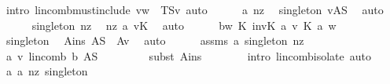\begin{isabellebody}
\ {\isacharparenleft}intro\ lincomb{\isacharunderscore}must{\isacharunderscore}include{\isacharbrackleft}\ {\isacharquery}v{\isacharequal}{\isachardoublequoteopen}w{\isachardoublequoteclose}\ \ {\isacharquery}T{\isacharequal}{\isachardoublequoteopen}S{\isasymunion}{\isacharbraceleft}v{\isacharbraceright}{\isachardoublequoteclose}{\isacharbrackright}{\isacharcomma}\ auto{\isacharparenright}\isanewline
\ \ \ \ \isamarkupfalse%
\ a\ nz{}\ \isamarkupfalse%
\ singleton{\isacharcolon}\ {\isachardoublequoteopen}{\isacharbraceleft}v{\isacharbraceright}{\isacharequal}A{\isacharminus}S{\isachardoublequoteclose}\ \isamarkupfalse%
\ auto\isanewline
\ \ \ \ \isamarkupfalse%
\ singleton\ nz{}\ \isamarkupfalse%
\ nz{}{\isacharcolon}\ {\isachardoublequoteopen}a\ v{\isasymnoteq}{\isasymzero}\isactrlbsub K\isactrlesub {\isachardoublequoteclose}\ \isamarkupfalse%
\ auto\isanewline
\isanewline
\ \ \ \ \isamarkupfalse%
\ {\isacharquery}b{\isacharequal}{\isachardoublequoteopen}{\isacharparenleft}{\isasymlambda}w{\isachardot}\ {\isasymominus}\isactrlbsub K\isactrlesub \ {\isacharparenleft}inv\isactrlbsub K\isactrlesub \ {\isacharparenleft}a\ v{\isacharparenright}{\isacharparenright}\ {\isasymotimes}\isactrlbsub K\isactrlesub \ {\isacharparenleft}a\ w{\isacharparenright}{\isacharparenright}{\isachardoublequoteclose}\isanewline
\ \ \ \ \isamarkupfalse%
\ singleton\ \isamarkupfalse%
\ Ains{\isacharcolon}\ {\isachardoublequoteopen}{\isacharparenleft}A{\isasyminter}S{\isacharparenright}\ {\isacharequal}\ A{\isacharminus}{\isacharbraceleft}v{\isacharbraceright}{\isachardoublequoteclose}\ \isamarkupfalse%
\ auto\isanewline
\ \ \ \ \isamarkupfalse%
\ assms\ a\ singleton\ nz{}\ \isamarkupfalse%
\ a{}{}{\isacharcolon}\ {\isachardoublequoteopen}v{\isacharequal}\ lincomb\ {\isacharquery}b\ {\isacharparenleft}A{\isasyminter}S{\isacharparenright}{\isachardoublequoteclose}\ \isanewline
\ \ \ \ \ \ \isamarkupfalse%
\ {\isacharparenleft}subst\ Ains{\isacharparenright}\isanewline
\ \ \ \ \ \ \isamarkupfalse%
\ {\isacharparenleft}intro\ lincomb{\isacharunderscore}isolate{\isacharparenleft}{}{\isacharparenright}{\isacharcomma}\ auto{\isacharparenright}\isanewline
\ \ \ \ \isamarkupfalse%
\ a\ a{}{}\ nz{}\ singleton\ \isamarkupfalse%

\end{isabellebody}
